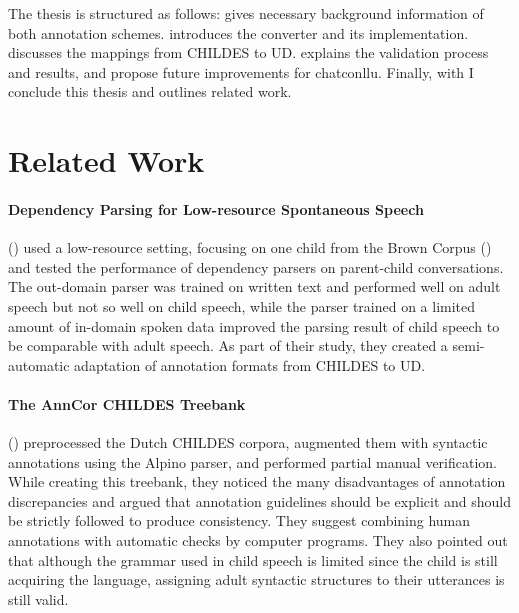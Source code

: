 The thesis is structured as follows:  gives necessary background information of both annotation schemes.  introduces the converter and its implementation.  discusses the mappings from CHILDES to UD.  explains the validation process and results, and propose future improvements for chatconllu. Finally, with  I conclude this thesis and outlines related work.

\section{Related Work}

\paragraph{Dependency Parsing for Low-resource Spontaneous Speech} %
\label{par:zoey}
(\cite{liu2021}) used a low-resource setting, focusing on one child from the Brown Corpus (\cite{brown1973}) and tested the performance of dependency parsers on parent-child conversations. The out-domain parser was trained on written text and performed well on adult speech but not so well on child speech, while the parser trained on a limited amount of in-domain spoken data improved the parsing result of child speech to be comparable with adult speech. As part of their study, they created a semi-automatic adaptation of annotation formats from CHILDES to UD.

\paragraph{The AnnCor CHILDES Treebank}
(\cite{odijk2018anncor}) preprocessed the Dutch CHILDES corpora, augmented them with syntactic annotations using the Alpino parser, and performed partial manual verification. While creating this treebank, they noticed the many disadvantages of annotation discrepancies and argued that annotation guidelines should be explicit and should be strictly followed to produce consistency. They suggest combining human annotations with automatic checks by computer programs. They also pointed out that although the grammar used in child speech is limited since the child is still acquiring the language, assigning adult syntactic structures to their utterances is still valid.

